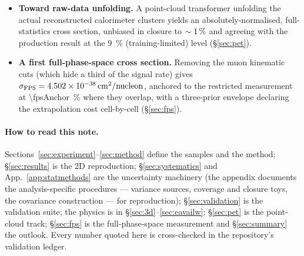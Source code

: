 \begin{itemize}[itemsep=2pt]
        the corrected magnitude (\S\ref{sec:uq-combine}).
  \item \textbf{Toward raw-data unfolding.} A point-cloud transformer
        unfolding the actual reconstructed calorimeter clusters yields
        an absolutely-normalised, full-statistics cross section, unbiased in
        closure to $\sim\SI{1}{\percent}$ and agreeing with the production
        result at the \SI{9}{\percent} (training-limited) level
        (\S\ref{sec:pet}).
  \item \textbf{A first full-phase-space cross section.} Removing the muon
        kinematic cuts (which hide a third of the signal rate) gives
        $\sigma_{\mathrm{FPS}}=\SI{4.502e-38}{cm^2/nucleon}$, anchored to the
        restricted measurement at \SI{\fpsAnchor}{\percent} where they overlap,
        with a three-prior envelope declaring the extrapolation cost
        cell-by-cell (\S\ref{sec:fps}).
\end{itemize}

\paragraph{How to read this note.}
Sections~\ref{sec:experiment}--\ref{sec:method} define the samples and the
method; \S\ref{sec:results} is the 2D reproduction;
\S\ref{sec:systematics} and App.~\ref{app:statmethods} are the uncertainty
machinery (the appendix documents the analysis-specific procedures
--- variance sources, coverage and closure toys, the covariance
construction --- for reproduction);
\S\ref{sec:validation} is the validation suite; the physics is in
\S\ref{sec:3d}--\ref{sec:eavailw}; \S\ref{sec:pet} is the point-cloud
track; \S\ref{sec:fps} is the full-phase-space measurement and
\S\ref{sec:summary} the outlook. Every number quoted here is cross-checked in
the repository's validation ledger.
